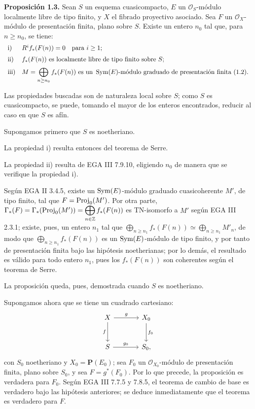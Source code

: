 \providecommand{\sisi}[2]{#2}

\textbf{Proposición 1.3.} Sean \(S\) un esquema cuasicompacto, \(E\) un \(\mathcal O_S\)-módulo localmente libre de tipo finito, y \(X\) el fibrado proyectivo asociado. Sea \(F\) un \(\mathcal O_X\)-módulo de presentación finita, plano sobre \(S\). Existe un entero \(n_0\) tal que, para \(n\geq n_0\), se tiene:
\[
\begin{array}{ll}
\text{i)}& R^i f_*(F(n))=0\quad\text{para }i\geq 1;\\[2mm]
\text{ii)}& f_*(F(n))\text{ es localmente libre de tipo finito sobre }S;\\[2mm]
\text{iii)}& M=\displaystyle\bigoplus_{n\geq n_0} f_*(F(n))\text{ es un }\operatorname{Sym}(E)\text{-módulo graduado de presentación finita (1.2).}
\end{array}
\]

Las propiedades buscadas son de naturaleza local sobre \(S\); como \(S\) es cuasicompacto, se puede, tomando el mayor de los enteros encontrados, reducir al caso en que \(S\) es afín.

Supongamos primero que \(S\) es noetheriano.

La propiedad i) resulta entonces del teorema de Serre.

La propiedad ii) resulta de EGA III 7.9.10, eligiendo \(n_0\) de manera que se verifique la propiedad i).

Según EGA II 3.4.5, existe un \(\operatorname{Sym}(E)\)-módulo graduado cuasicoherente \(M'\), de tipo finito, tal que \(F=\operatorname{Proj}_0(M')\). Por otra parte, \(\Gamma_*(F)=\Gamma_*(\operatorname{Proj}_0(M'))=\displaystyle\bigoplus_{n\in\mathbb Z} f_*(F(n))\) es TN-isomorfo a \(M'\) según \sisi{ECA}{EGA} III 2.3.1; existe, pues, un entero \(n_1\) tal que \(\displaystyle\bigoplus_{n\geq n_1} f_*(F(n))\simeq \bigoplus_{n\geq n_1} M'_n\),
de modo que \(\bigoplus_{n\geq n_1} f_*(F(n))\) es un \(\operatorname{Sym}(E)\)-módulo de tipo finito, y por tanto de presentación finita bajo las hipótesis noetherianas; por lo demás, el resultado es válido para todo entero \(n_1\), pues los \(f_*(F(n))\) son coherentes según el teorema de Serre.

La proposición queda, pues, demostrada cuando \(S\) es noetheriano.

Supongamos ahora que se tiene un cuadrado cartesiano:
\[
\begin{tikzcd}[column sep=large,row sep=large]
X \arrow[r,"g"] \arrow[d,"f"'] & X_0 \arrow[d,"f_0"]\\
S \arrow[r,"g_0"] & S_0,
\end{tikzcd}
\]
con \(S_0\) noetheriano y \(X_0=\mathbf P(E_0)\); sea \(F_0\) un \(\sisi{\mathcal O_X}{\mathcal O_{X_0}}\)-módulo de presentación finita, plano sobre \(S_0\), y sea \(F=g^*(F_0)\). Por lo que precede, la proposición es verdadera para \(F_0\). Según EGA III 7.7.5 y 7.8.5, el teorema de cambio de base es verdadero bajo las hipótesis anteriores; se deduce inmediatamente que el teorema es verdadero para \(F\).

